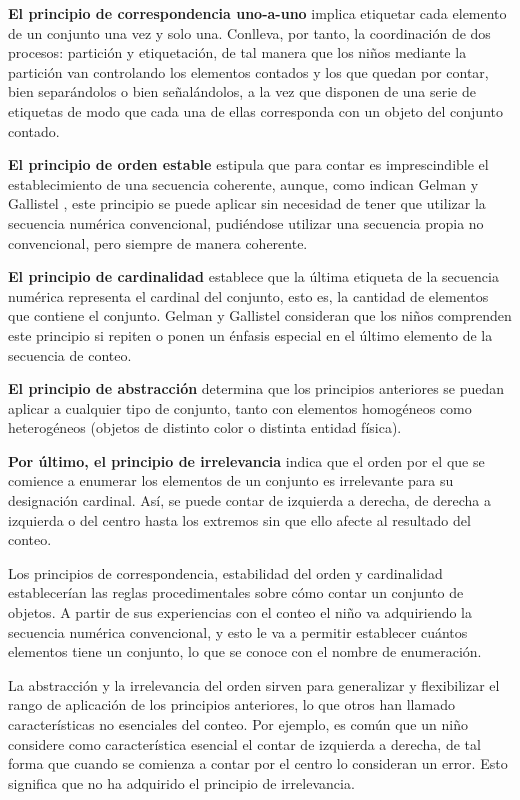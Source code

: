 \documentclass{article}
\begin{document}
\textbf{El principio de correspondencia uno-a-uno}  implica etiquetar cada elemento de un conjunto una vez y solo una. Conlleva, por tanto, la coordinación de dos procesos: partición y etiquetación, de tal manera que los niños mediante la partición van controlando los elementos contados y los que quedan por contar, bien separándolos o bien señalándolos, a la vez que disponen de una serie de etiquetas de modo que cada una de ellas corresponda con un objeto del conjunto contado. 

\textbf{El principio de orden estable} estipula que para contar es imprescindible el establecimiento de una secuencia coherente, aunque, como indican Gelman y Gallistel \cite{german1978child}, este principio se puede aplicar sin necesidad de tener que utilizar la secuencia numérica convencional, pudiéndose utilizar una secuencia propia no convencional, pero siempre de manera coherente.

\textbf{El principio de cardinalidad} establece que la última etiqueta de la secuencia numérica representa el cardinal del conjunto, esto es, la cantidad de elementos que contiene el conjunto. Gelman y Gallistel \cite{german1978child} consideran que los niños comprenden este principio si repiten o ponen un énfasis especial en el último elemento de la secuencia de conteo.

\textbf{El principio de abstracción} determina que los principios anteriores se puedan aplicar a cualquier tipo de conjunto, tanto con elementos homogéneos como heterogéneos (objetos de distinto color o distinta entidad física).

\textbf{Por último, el principio de irrelevancia }indica que el orden por el que se comience a enumerar los elementos de un conjunto es irrelevante para su designación cardinal. Así, se puede contar de izquierda a derecha, de derecha a izquierda o del centro hasta los extremos sin que ello afecte al resultado del conteo.

Los principios de correspondencia, estabilidad del orden y cardinalidad establecerían las reglas procedimentales sobre cómo contar un conjunto de objetos. A partir de sus experiencias con el conteo el niño va adquiriendo la secuencia numérica convencional, y esto le va a permitir establecer cuántos elementos tiene un conjunto, lo que se conoce con el nombre de enumeración.

La abstracción y la irrelevancia del orden sirven para generalizar y flexibilizar el rango de aplicación de los principios anteriores, lo que otros han llamado características no esenciales del conteo. Por ejemplo, es común que un niño considere como característica esencial el contar de izquierda a derecha, de tal forma que cuando se comienza a contar por el centro lo consideran un error. Esto significa que no ha adquirido el principio de irrelevancia.
\end{document}
